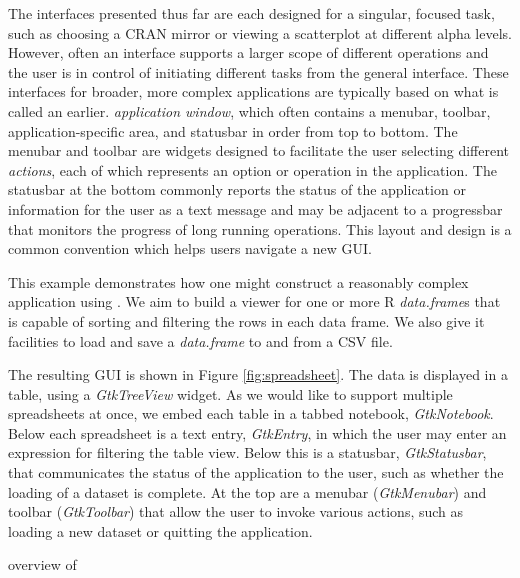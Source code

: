 \documentclass[article]{jss}
\begin{document}
The interfaces presented thus far are each designed for a singular,
focused task, such as choosing a CRAN mirror or viewing a scatterplot
at different alpha levels.  However, often an interface supports a
larger scope of different operations and the user is in control of
initiating different tasks from the general interface. These
interfaces for broader, more complex
applications are typically based on what is called an
earlier.
\emph{application window}, which often contains a menubar, toolbar,
application-specific area, and statusbar in order from top to
bottom. The menubar and toolbar are widgets designed to facilitate the
user selecting different \emph{actions}, each of which represents an
option or operation in the application.  The statusbar at the bottom
commonly reports the status of the application or information for the
user as a text message and may be adjacent to a progressbar that
monitors the progress of long running operations.  This layout and
design is a common convention which helps users navigate a new GUI.


This example demonstrates how one might construct a reasonably complex
application using . We aim to build a viewer for one or
more R \emph{data.frame}s that is capable of sorting and filtering the
rows in each data frame. We also give it facilities to load and save a
\emph{data.frame} to and from a CSV file. 

The resulting GUI is shown in Figure \ref{fig:spreadsheet}. The data
is displayed in a table, using a \emph{GtkTreeView} widget. As we would like to support multiple spreadsheets at once, we embed each table in a tabbed notebook, \emph{GtkNotebook}. Below each spreadsheet is a text entry, \emph{GtkEntry}, in which the user may enter an expression for filtering the table view. Below this is a statusbar,
\emph{GtkStatusbar}, that communicates the status of the application
to the user, such as whether the loading of a dataset is complete. At
the top are a menubar (\emph{GtkMenubar}) and toolbar
(\emph{GtkToolbar}) that allow the user to invoke various actions,
such as loading a new dataset or quitting the application.

overview of

\end{document}
